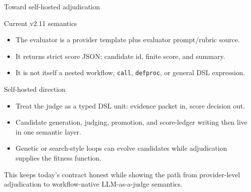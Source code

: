 \documentclass[aspectratio=169]{beamer}
\begin{document}
\begin{frame}{Toward self-hosted adjudication}
\small
\begin{block}{Current v2.11 semantics}
\begin{itemize}
  \item The evaluator is a provider template plus evaluator prompt/rubric source.
  \item It returns strict score JSON: candidate id, finite score, and summary.
  \item It is not itself a nested workflow, \texttt{call}, \texttt{defproc}, or general DSL expression.
\end{itemize}
\end{block}
\vspace{0.35em}
\begin{block}{Self-hosted direction}
\begin{itemize}
  \item Treat the judge as a typed DSL unit: evidence packet in, score decision out.
  \item Candidate generation, judging, promotion, and score-ledger writing then live in one semantic layer.
  \item Genetic or search-style loops can evolve candidates while adjudication supplies the fitness function.
\end{itemize}
\end{block}
\vspace{0.25em}
\footnotesize
This keeps today's contract honest while showing the path from provider-level adjudication to workflow-native LLM-as-a-judge semantics.
\end{frame}
\end{document}
